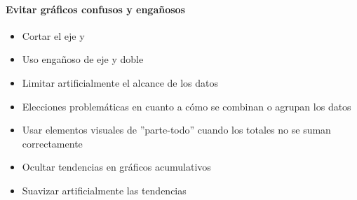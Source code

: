 
\paragraph{Evitar gráficos confusos y engañosos}
\begin{itemize}
    \item {Cortar el eje y}
    \item {Uso engañoso de eje y doble}
    \item {Limitar artificialmente el alcance de los datos}
    \item {Elecciones problemáticas en cuanto a cómo se combinan o agrupan los datos}
    \item {Usar elementos visuales de ''parte-todo'' cuando los totales no se suman correctamente}
    \item {Ocultar tendencias en gráficos acumulativos}
    \item {Suavizar artificialmente las tendencias}
    
\end{itemize}

\newpage